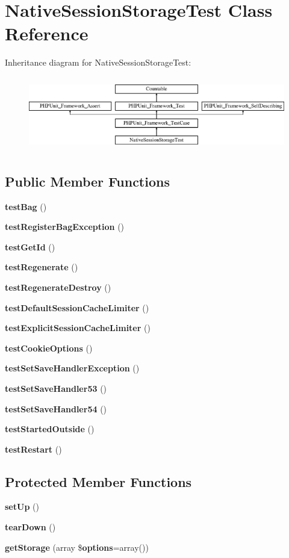 \section{Native\+Session\+Storage\+Test Class Reference}
\label{class_symfony_1_1_component_1_1_http_foundation_1_1_tests_1_1_session_1_1_storage_1_1_native_session_storage_test}
Inheritance diagram for Native\+Session\+Storage\+Test\+:\begin{figure}[H]
\begin{center}
\leavevmode
\includegraphics[height=3.303835cm]{class_symfony_1_1_component_1_1_http_foundation_1_1_tests_1_1_session_1_1_storage_1_1_native_session_storage_test}
\end{center}
\end{figure}
\subsection*{Public Member Functions}
\begin{DoxyCompactItemize}
\item 
{\bf test\+Bag} ()
\item 
{\bf test\+Register\+Bag\+Exception} ()
\item 
{\bf test\+Get\+Id} ()
\item 
{\bf test\+Regenerate} ()
\item 
{\bf test\+Regenerate\+Destroy} ()
\item 
{\bf test\+Default\+Session\+Cache\+Limiter} ()
\item 
{\bf test\+Explicit\+Session\+Cache\+Limiter} ()
\item 
{\bf test\+Cookie\+Options} ()
\item 
{\bf test\+Set\+Save\+Handler\+Exception} ()
\item 
{\bf test\+Set\+Save\+Handler53} ()
\item 
{\bf test\+Set\+Save\+Handler54} ()
\item 
{\bf test\+Started\+Outside} ()
\item 
{\bf test\+Restart} ()
\end{DoxyCompactItemize}
\subsection*{Protected Member Functions}
\begin{DoxyCompactItemize}
\item 
{\bf set\+Up} ()
\item 
{\bf tear\+Down} ()
\item 
{\bf get\+Storage} (array \${\bf options}=array())
\end{DoxyCompactItemize}
